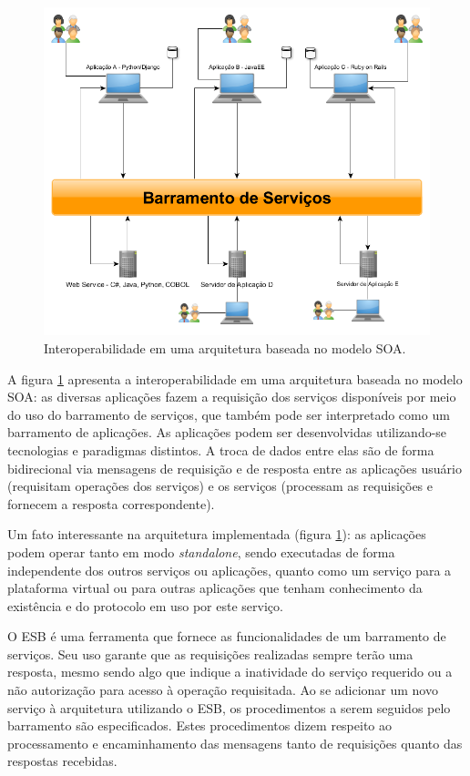 \begin{figure}[!hbt]
\centering
\includegraphics[scale=0.4]{figuras/barramento_interoperabilidade.png}
\caption{Interoperabilidade em uma arquitetura baseada no modelo SOA.}
\label{barramento_interoperabilidade}
\end{figure}

A figura \ref{barramento_interoperabilidade} apresenta a interoperabilidade em uma arquitetura baseada no modelo SOA:  as diversas aplicações fazem a requisição dos serviços disponíveis por meio do uso do barramento de serviços, que também pode ser interpretado como um barramento de aplicações. As aplicações podem ser desenvolvidas utilizando-se tecnologias e paradigmas distintos. A troca de dados entre elas são de forma bidirecional via mensagens de requisição e de resposta entre as aplicações usuário (requisitam operações dos serviços) e os serviços (processam as requisições e fornecem a resposta correspondente).

Um fato interessante na arquitetura implementada (figura \ref{barramento_interoperabilidade}): as aplicações podem operar tanto em modo \textit{standalone}, sendo executadas de forma independente dos outros serviços ou aplicações, quanto como um serviço para a plataforma virtual ou para outras aplicações que tenham conhecimento da existência e do protocolo em uso por este serviço.

O ESB é uma ferramenta que fornece as funcionalidades de um barramento de serviços. Seu uso garante que as requisições realizadas sempre terão uma resposta, mesmo sendo algo que indique a inatividade do serviço requerido ou a não autorização para acesso à operação requisitada. Ao se adicionar um novo serviço à arquitetura utilizando o ESB, os procedimentos a serem seguidos pelo barramento são especificados. Estes procedimentos dizem respeito ao processamento e encaminhamento das mensagens tanto de requisições quanto das respostas recebidas.


